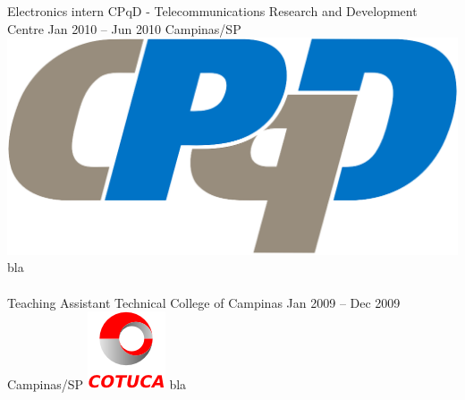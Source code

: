 \documentclass[
	a4paper,
]{fortysecondscv}
\newcommand{\profiledivider}{\textcolor{body!30}{\hdashrule{\linewidth}{0.6pt}{0.5ex}}\\}
\begin{document}
    \cvevent
        {Electronics intern}
        {CPqD - Telecommunications Research and Development Centre}
        {Jan 2010 -- Jun 2010}
        {Campinas/SP}
        {\hspace{2mm}\includegraphics[height=0.07\textwidth]{CPqD}}
        {bla}
    \\\profiledivider
    \cvevent
        {Teaching Assistant}
        {Technical College of Campinas}
        {Jan 2009 -- Dec 2009}
        {Campinas/SP}
        {\hspace{2mm}\includegraphics[height=0.07\textwidth]{Cotuca}}
        {bla}
\end{document}
